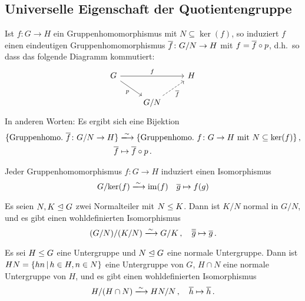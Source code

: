 \subsection{Universelle Eigenschaft der Quotientengruppe}

\begin{theorem}
  Ist $f \colon G \to H$ ein Gruppenhomomorphismus mit $N \subseteq \ker(f)$, so induziert $f$ einen eindeutigen Gruppenhomomorphismus $\overline{f} \colon G/N \to H$ mit $f = \overline{f} \circ p$, d.h.\ so dass das folgende Diagramm kommutiert:
  \[
    \begin{tikzcd}
        G
        \arrow{rr}[above]{f}
        \arrow{dr}[below left]{p}
      & {}
      & H
      \\
        {}
      & G/N
        \arrow[dashed]{ru}[below right]{\induced{f}}
      & {}
    \end{tikzcd}
  \]
  In anderen Worten:
  Es ergibt sich eine Bijektion
  \begin{align*}
                            \{ \text{Gruppenhomo.\ $\induced{f} \colon G/N \to H$} \}
    &\xlongrightarrow{\sim} \{ \text{Gruppenhomo.\ $f \colon G \to H$ mit $N \subseteq \ker(f)$} \} \,,  \\
                            \induced{f}
    &\mapsto                \induced{f} \circ p \,.
  \end{align*}
\end{theorem}

\begin{corollary}[1.\ Isomorphiesatz]
  Jeder Gruppenhomomorphismus $f \colon G \to H$ induziert einen Isomorphismus
  \[
                            G/{\ker(f)}
    \xlongrightarrow{\sim}  \im(f)
    \quad                   \class{g}
    \mapsto                 f(g)
  \]
\end{corollary}

\begin{corollary}[2.\ Isomorphiesatz]
  Es seien $N, K \mathrel{\trianglelefteq} G$ zwei Normalteiler mit $N \mathrel{\leq} K$.
  Dann ist $K/N$ normal in $G/N$, und es gibt einen wohldefinierten Isomorphismus
  \[
                            (G/N)/(K/N)
    \xlongrightarrow{\sim}  G/K \,,
    \quad                   \class{ \class{g} }
    \mapsto                 \class{g} \,.
  \]
\end{corollary}

\begin{corollary}[3.\ Isomorphiesatz]
  Es sei $H \mathrel{\leq} G$ eine Untergruppe und $N \mathrel{\trianglelefteq} G$ eine normale Untergruppe.
  Dann ist $HN = \{hn \suchthat h \in H, n \in N\}$ eine Untergruppe von $G$, $H \cap N$ eine normale Untergruppe von $H$, und es gibt einen wohldefinierten Isomorphismus
  \[
                            H/(H \cap N)
    \xlongrightarrow{\sim}  HN/N \,,
    \quad                   \class{h}
    \mapsto                 \class{h} \,.
  \]
\end{corollary}



